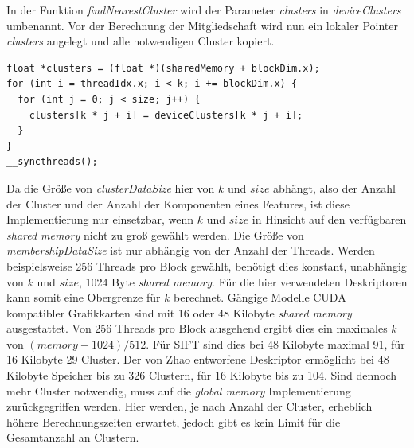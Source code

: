 In der Funktion \textit{findNearestCluster} wird der Parameter \textit{clusters} in \textit{deviceClusters} umbenannt. Vor der Berechnung der Mitgliedschaft wird nun ein lokaler Pointer \textit{clusters} angelegt und alle notwendigen Cluster kopiert.

\lstset{language=C}
\begin{lstlisting}
float *clusters = (float *)(sharedMemory + blockDim.x);
for (int i = threadIdx.x; i < k; i += blockDim.x) {
  for (int j = 0; j < size; j++) {
    clusters[k * j + i] = deviceClusters[k * j + i];
  }
}
__syncthreads();
\end{lstlisting}

Da die Größe von \textit{clusterDataSize} hier von $k$ und $size$ abhängt, also der Anzahl der Cluster und der Anzahl der Komponenten eines Features, ist diese Implementierung nur einsetzbar, wenn $k$ und $size$ in Hinsicht auf den verfügbaren \textit{shared memory} nicht zu groß gewählt werden. Die Größe von \textit{membershipDataSize} ist nur abhängig von der Anzahl der Threads. Werden beispielsweise 256 Threads pro Block gewählt, benötigt dies konstant, unabhängig von $k$ und $size$, 1024 Byte \textit{shared memory}. Für die hier verwendeten Deskriptoren kann somit eine Obergrenze für $k$ berechnet. Gängige Modelle CUDA kompatibler Grafikkarten sind mit 16 oder 48 Kilobyte \textit{shared memory} ausgestattet. Von 256 Threads pro Block ausgehend ergibt dies ein maximales $k$ von $(memory - 1024) / 512$. Für SIFT sind dies bei 48 Kilobyte maximal 91, für 16 Kilobyte 29 Cluster. Der von Zhao entworfene Deskriptor ermöglicht bei 48 Kilobyte Speicher bis zu 326 Clustern, für 16 Kilobyte bis zu 104. Sind dennoch mehr Cluster notwendig, muss auf die \textit{global memory} Implementierung zurückgegriffen werden. Hier werden, je nach Anzahl der Cluster, erheblich höhere Berechnungszeiten erwartet, jedoch gibt es kein Limit für die Gesamtanzahl an Clustern.